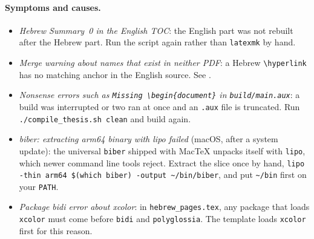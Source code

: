 \paragraph{Symptoms and causes.}
\begin{itemize}
    \item \emph{Hebrew Summary~0 in the English TOC}: the English part was not rebuilt after the Hebrew part. Run the script again rather than \texttt{latexmk} by hand.
    \item \emph{Merge warning about names that exist in neither PDF}: a Hebrew \verb|\hyperlink| has no matching anchor in the English source. See .
    \item \emph{Nonsense errors such as \texttt{Missing \textbackslash begin\{document\}} in \texttt{build/main.aux}}: a build was interrupted or two ran at once and an \texttt{.aux} file is truncated. Run \texttt{./compile\_thesis.sh clean} and build again.
    \item \emph{biber: extracting arm64 binary with lipo failed} (macOS, after a system update): the universal \texttt{biber} shipped with MacTeX unpacks itself with \texttt{lipo}, which newer command line tools reject. Extract the slice once by hand, \texttt{lipo -thin arm64 \$(which biber) -output \textasciitilde/bin/biber}, and put \texttt{\textasciitilde/bin} first on your \texttt{PATH}.
    \item \emph{Package bidi error about xcolor}: in \texttt{hebrew\_pages.tex}, any package that loads \texttt{xcolor} must come before \texttt{bidi} and \texttt{polyglossia}. The template loads \texttt{xcolor} first for this reason.
\end{itemize}

